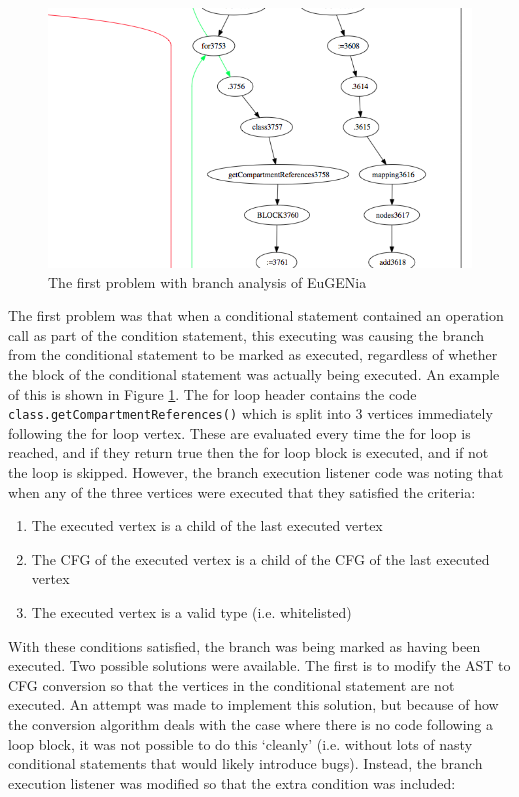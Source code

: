 \begin{figure}
\centering
\includegraphics[scale=0.3]{figures/caseStudyProblem1}
\caption{The first problem with branch analysis of EuGENia}
\label{fig:caseStudyProblem1}
\end{figure}

The first problem was that when a conditional statement contained an operation call as part of the condition statement, this executing was causing the branch from the conditional statement to be marked as executed, regardless of whether the block of the conditional statement was actually being executed. An example of this is shown in Figure \ref{fig:caseStudyProblem1}. The for loop header contains the code \verb|class.getCompartmentReferences()| which is split into 3 vertices immediately following the for loop vertex. These are evaluated every time the for loop is reached, and if they return true then the for loop block is executed, and if not the loop is skipped. However, the branch execution listener code was noting that when any of the three vertices were executed that they satisfied the criteria:

\begin{enumerate}
\item The executed vertex is a child of the last executed vertex
\item The CFG of the executed vertex is a child of the CFG of the last executed vertex
\item The executed vertex is a valid type (i.e. whitelisted)
\end{enumerate}

With these conditions satisfied, the branch was being marked as having been executed. Two possible solutions were available. The first is to modify the AST to CFG conversion so that the vertices in the conditional statement are not executed. An attempt was made to implement this solution, but because of how the conversion algorithm deals with the case where there is no code following a loop block, it was not possible to do this `cleanly' (i.e. without lots of nasty conditional statements that would likely introduce bugs). Instead, the branch execution listener was modified so that the extra condition was included:

